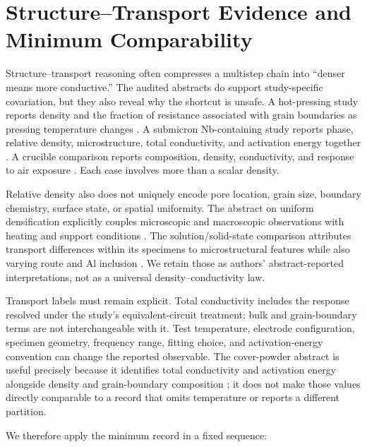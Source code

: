 \section{Structure--Transport Evidence and Minimum Comparability}

Structure--transport reasoning often compresses a multistep chain into ``denser means more conductive.'' The audited abstracts do support study-specific covariation, but they also reveal why the shortcut is unsafe. A hot-pressing study reports density and the fraction of resistance associated with grain boundaries as pressing temperature changes \cite{david2015microstructure}. A submicron Nb-containing study reports phase, relative density, microstructure, total conductivity, and activation energy together \cite{yan2020submicron}. A crucible comparison reports composition, density, conductivity, and response to air exposure \cite{xia2016ionic}. Each case involves more than a scalar density.

Relative density also does not uniquely encode pore location, grain size, boundary chemistry, surface state, or spatial uniformity. The abstract on uniform densification explicitly couples microscopic and macroscopic observations with heating and support conditions \cite{guo2023uniform}. The solution/solid-state comparison attributes transport differences within its specimens to microstructural features while also varying route and Al inclusion \cite{kosir2022comparative}. We retain those as authors' abstract-reported interpretations, not as a universal density--conductivity law.

Transport labels must remain explicit. Total conductivity includes the response resolved under the study's equivalent-circuit treatment; bulk and grain-boundary terms are not interchangeable with it. Test temperature, electrode configuration, specimen geometry, frequency range, fitting choice, and activation-energy convention can change the reported observable. The cover-powder abstract is useful precisely because it identifies total conductivity and activation energy alongside density and grain-boundary composition \cite{zhang2019densification}; it does not make those values directly comparable to a record that omits temperature or reports a different partition.

We therefore apply the minimum record in a fixed sequence:

